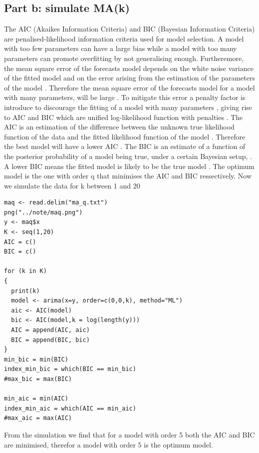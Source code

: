 \documentclass[11pt, oneside]{article}   	%
\begin{document}
\subsection{Part b: simulate MA(k)}
The AIC (Akaikes Information Criteria) and BIC (Bayesian Information Criteria) are penalised-likelihood information criteria \cite{ziak, petter} used for model selection.  A model with too few parameters can have a large bias while a model with too many parameters can promote overfitting by not generalising enough. Furtheremore, the mean square error of the forecasts model depends on the white noise variance of the fitted model and on the error arising from the estimation of the parameters of the model \cite{ziak}.
Therefore  the mean square error of the forecasts model for a model with many parameters, will be large \cite{petter}. To mitigate this error a penalty factor is introduce to discourage the fitting 
of a model with many parameters \cite{petter}, giving rise to AIC and BIC which are unified log-likelihood function with penalties \cite{ziak}.
\justify
The AIC is an estimation of the difference between the unknown true likelihood function of the data and the fitted likelihood function of the model \cite{ziak}. Therefore the best model will have a lower AIC \cite{ziak}. The BIC is an estimate of a function of the posterior probability of a model being true, under a certain Bayesian setup, \cite{ziak}. A lower BIC means the fitted model is likely to be the true model \cite{ziak}. The optimum model is the one with order q that minimises the AIC and BIC ressectively.
\justify
Now we simulate the data for k between 1 and 20
\begin{lstlisting}
maq <- read.delim("ma_q.txt")
png("../note/maq.png")
y <- maq$x
K <- seq(1,20)
AIC = c()
BIC = c()

for (k in K)
{
  print(k)
  model <- arima(x=y, order=c(0,0,k), method="ML")
  aic <- AIC(model)
  bic <- AIC(model,k = log(length(y)))
  AIC = append(AIC, aic)
  BIC = append(BIC, bic)
}
min_bic = min(BIC)
index_min_bic = which(BIC == min_bic)
#max_bic = max(BIC)

min_aic = min(AIC)
index_min_aic = which(AIC == min_aic)
#max_aic = max(AIC)
\end{lstlisting}
\justify
From the simulation we find that for a model with order 5 both the AIC and BIC are minimised, therefor a model with order 5 is the optimum model.
\end{document}
